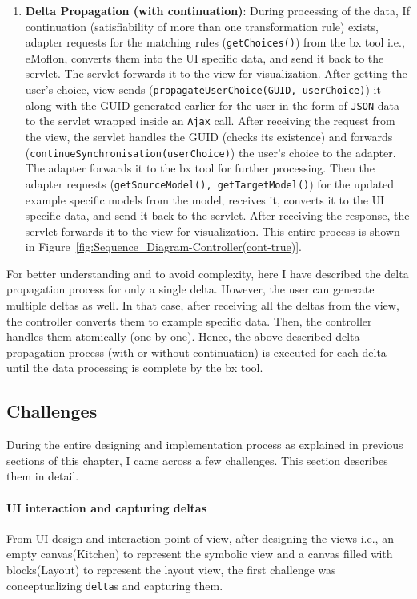 \begin{enumerate}
	\item {\textbf{Delta Propagation (with continuation)}: During processing of the data, If continuation (satisfiability of more than one transformation rule) exists, adapter requests for the matching rules (\texttt{getChoices()}) from the bx tool i.e., eMoflon, converts them into the UI specific data, and send it back to the servlet. The servlet forwards it to the view for visualization. After getting the user's choice, view sends (\texttt{propagateUserChoice(GUID, userChoice)}) it along with the GUID generated earlier for the user in the form of \texttt{JSON} data to the servlet wrapped inside an \texttt{Ajax} call. After receiving the request from the view, the servlet handles the GUID (checks its existence) and forwards (\texttt{continueSynchronisation(userChoice)}) the user's choice to the adapter. The adapter forwards it to the bx tool for further processing. Then the adapter requests (\texttt{getSourceModel(), getTargetModel()}) for the updated example specific models from the model, receives it, converts it to the UI specific data, and send it back to the servlet. After receiving the response, the servlet forwards it to the view for visualization. This entire process is shown in Figure~\ref{fig:Sequence_Diagram-Controller(cont-true)}.}
\end{enumerate}

For better understanding and to avoid complexity, here I have described the delta propagation process for only a single delta. However, the user can generate multiple deltas as well. In that case, after receiving all the deltas from the view, the controller converts them to example specific data. Then, the controller handles them atomically (one by one). Hence, the above described delta propagation process (with or without continuation) is executed for each delta until the data processing is complete by the bx tool.

\subsection{Challenges}\label{subsec:designchallenges}
During the entire designing and implementation process as explained in previous sections of this chapter, I came across a few challenges. This section describes them in detail. 

\paragraph{UI interaction and capturing deltas}
From UI design and interaction point of view, after designing the views i.e., an empty canvas(Kitchen) to represent the symbolic view and a canvas filled with blocks(Layout) to represent the layout view, the first challenge was conceptualizing \texttt{delta}s and capturing them. 

